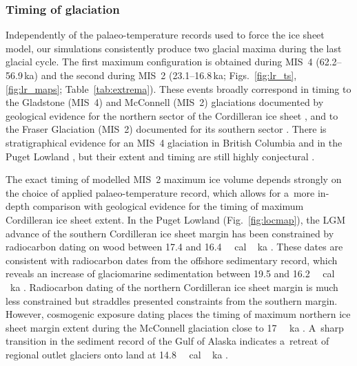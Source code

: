 \documentclass[tc, manuscript]{copernicus}
\begin{document}
\subsubsection{Timing of glaciation}
\label{sec:timing}

      Independently of the palaeo-temperature records used to force the ice
      sheet model, our simulations consistently produce two glacial maxima
      during the last glacial cycle. The first maximum configuration is
      obtained during MIS~4 (62.2--56.9\,\unit{ka}) and the second during
      MIS~2 (23.1--16.8\,\unit{ka}; Figs.~\ref{fig:lr_ts},
      \ref{fig:lr_maps}; Table~\ref{tab:extrema}). These events broadly
      correspond in timing to the Gladstone (MIS~4) and McConnell (MIS~2)
      glaciations documented by geological evidence for the northern sector
      of the Cordilleran ice sheet \citep{Duk-Rodkin.etal.1996,
      Ward.etal.2007, Stroeven.etal.2010, Stroeven.etal.2014}, and to the
      Fraser Glaciation (MIS~2) documented for its southern sector
      \citep{Porter.Swanson.1998, Margold.etal.2014}. There is
      stratigraphical evidence for an MIS~4 glaciation in British Columbia
      \citep{Clague.Ward.2011} and in the Puget Lowland \citep{Troost.2014},
      but their extent and timing are still highly conjectural
      \citep[perhaps MIS~4 or early MIS~3; e.g.,][]{Cosma.etal.2008}.

      The exact timing of modelled MIS~2 maximum ice volume depends strongly
      on the choice of applied palaeo-temperature record, which allows for
      a~more in-depth comparison with geological evidence for the timing of
      maximum Cordilleran ice sheet extent. In the Puget Lowland
      (Fig.~\ref{fig:locmap}), the LGM advance of the southern Cordilleran
      ice sheet margin has been constrained by radiocarbon dating on wood
      between 17.4 and 16.4\,\unit{\,cal\,ka}
      \citep{Porter.Swanson.1998}. These dates are consistent with
      radiocarbon dates from the offshore sedimentary record, which reveals
      an increase of glaciomarine sedimentation between 19.5 and
      16.2\,\unit{\,cal\,ka} \citep{Cosma.etal.2008,
      Taylor.etal.2014}. Radiocarbon dating of the northern Cordilleran ice
      sheet margin is much less constrained but straddles presented
      constraints from the southern margin. However, cosmogenic exposure
      dating places the timing of maximum northern ice sheet margin extent
      during the McConnell
      glaciation close to 17\,\unit{\,ka}
      \citep{Stroeven.etal.2010, Stroeven.etal.2014}. A~sharp transition in
      the sediment record of the Gulf of Alaska indicates a~retreat of
      regional outlet glaciers onto land at
      14.8\,\unit{\,cal\,ka} \citep{Davies.etal.2011}.
\end{document}
